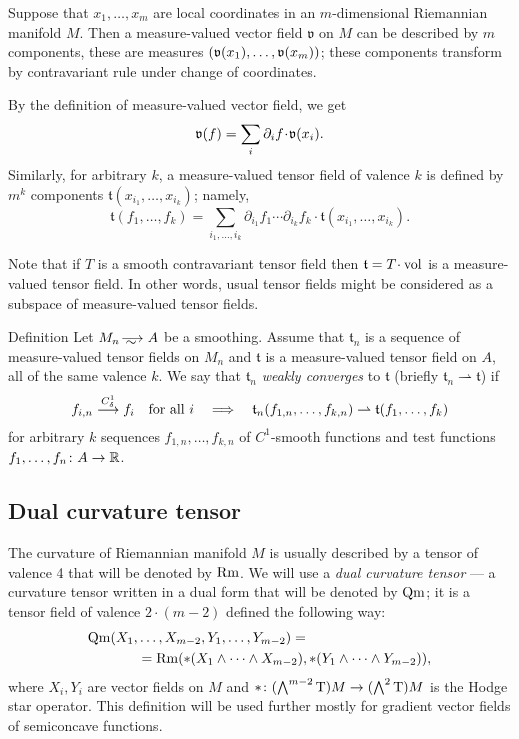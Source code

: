 Suppose that $x_1,\dots,x_m$ are local coordinates in an $m$-dimensional Riemannian manifold $M$.
Then a measure-valued vector field $\mathfrak{v}$ on $M$ can be described by $m$ components, these are measures $(\vv(x_1),\zz\dots,\vv(x_m))$;
these components transform by contravariant rule under change of coordinates.

By the definition of measure-valued vector field, we get
\[\mathfrak{v}(f)=\sum_{i}\partial_i f\cdot \vv(x_i).\]
Similarly, for arbitrary $k$, a measure-valued tensor field of valence $k$ is defined by $m^k$ components 
$\mathfrak{t}(x_{i_1},\dots,x_{i_k})$; namely,
\[\mathfrak{t}(f_1,\dots,f_k)
=
\sum_{i_1,\dots,i_k}
\partial_{i_1} f_1 
\cdots 
\partial_{i_k} f_k
\cdot \mathfrak{t}(x_{i_1},\dots,x_{i_k}).\]

Note that if $T$ is a smooth contravariant tensor field then $\mathfrak{t}=T\cdot \vol$ is a measure-valued tensor field.
In other words, usual tensor fields might be considered as a subspace of measure-valued tensor fields.

\begin{rdef}{Definition}
Let $M_n\smooths{} A$ be a smoothing.
Assume that $\mathfrak{t}_n$ is a sequence of %
 measure-valued tensor fields on $M_n$  and $\mathfrak{t}$ is a measure-valued tensor field on $A$,
all of the same valence $k$.
We say that $\mathfrak{t}_n$ \emph{weakly converges} to  $\mathfrak{t}$
(briefly $\mathfrak{t}_n\rightharpoonup\mathfrak{t}$) if
\[f_{i,n}\smoothto f_i\quad\text{for all\ } i
\quad\Longrightarrow\quad
\mathfrak{t}_n(f_{1,n},\dots,f_{k,n})\zz\rightharpoonup\mathfrak{t}(f_{1},\dots,f_{k})\]
for arbitrary $k$ sequences $f_{1,n},\dots,f_{k,n}$ of $C^1$-smooth functions and test functions $f_1,\dots,f_n\:A\zz\to\RR$.
\end{rdef}

\subsection{Dual curvature tensor}

The curvature of Riemannian manifold $M$ is usually described by a tensor of valence 4 that will be denoted by $\operatorname{\rm Rm}$.
We will use a \emph{dual curvature tensor} --- 
a curvature tensor written in a dual form that will be denoted by $\operatorname{\rm Qm}$;
it is a tensor field of valence $2\cdot(m-2)$ defined the following way:
\begin{align*}
\operatorname{\rm Qm}(X_1,&\dots,X_{m-2},Y_1,\dots,Y_{m-2})
= 
\\
&=
\operatorname{\rm Rm}(*(X_1\wedge\dots\wedge X_{m-2}),*(Y_1\wedge\dots\wedge Y_{m-2})),
\end{align*}
where $X_i,Y_i$ are vector fields on $M$ and  ${*}\:(\bigwedge^{m-2}\T)M\zz\to(\bigwedge^2\T)M$ is the  Hodge star operator.
This definition will be used further mostly for gradient vector fields of semiconcave functions.


